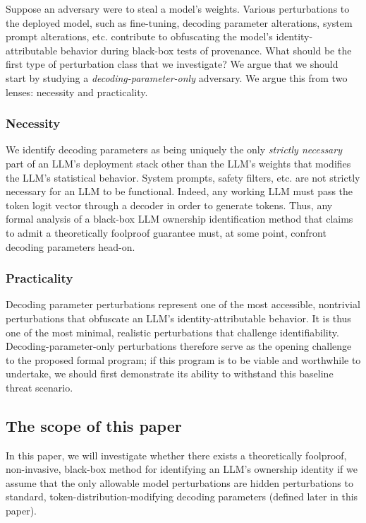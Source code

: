 \documentclass{article}
\begin{document}
Suppose an adversary were to steal a model's weights. Various perturbations to the deployed model, such as fine-tuning, decoding parameter alterations, system prompt alterations, etc. contribute to obfuscating the model's identity-attributable behavior during black-box tests of provenance. What should be the first type of perturbation class that we investigate? We argue that we should start by studying a \textit{decoding-parameter-only} adversary. We argue this from two lenses: necessity and practicality.



\subsubsection{Necessity}

We identify decoding parameters as being uniquely the only \textit{strictly necessary} part of an LLM's deployment stack other than the LLM's weights that modifies the LLM's statistical behavior. System prompts, safety filters, etc. are not strictly necessary for an LLM to be functional. Indeed, any working LLM must pass the token logit vector through a decoder in order to generate tokens. Thus, any formal analysis of a black-box LLM ownership identification method that claims to admit a theoretically foolproof guarantee must, at some point, confront decoding parameters head-on.



\subsubsection{Practicality}

Decoding parameter perturbations represent one of the most accessible, nontrivial perturbations that obfuscate an LLM's identity-attributable behavior. It is thus one of the most minimal, realistic perturbations that challenge identifiability. Decoding-parameter-only perturbations therefore serve as the opening challenge to the proposed formal program; if this program is to be viable and worthwhile to undertake, we should first demonstrate its ability to withstand this baseline threat scenario.



\subsection{The scope of this paper}

In this paper, we will investigate whether there exists a theoretically foolproof, non-invasive, black-box method for identifying an LLM's ownership identity if we assume that the only allowable model perturbations are hidden perturbations to standard, token-distribution-modifying decoding parameters (defined later in this paper).
\end{document}
